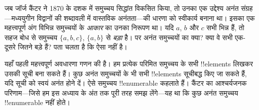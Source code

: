 \documentclass[../../../include/open-logic-section]{subfiles}
\begin{document}


जब जॉर्ज कैंटर ने 1870 के दशक में समुच्चय सिद्धांत विकसित किया, तो उनका एक
उद्देश्य अनंत संग्रह---मध्ययुगीन विद्वानों की शब्दावली में वास्तविक
अनंतता---की धारणा को स्वीकार्य बनाना था। इसका एक महत्त्वपूर्ण अंग विभिन्न
समुच्चयों के \emph{आकार} का उनका निरूपण था। यदि $a$, $b$ और $c$ सभी भिन्न
हैं, तो सहज बोध से समुच्चय $\{a, b, c\}$, $\{a, b\}$ से \emph{बड़ा} है।
पर अनंत समुच्चयों का क्या? क्या वे सभी एक-दूसरे जितने बड़े हैं? पता चलता है
कि ऐसा नहीं है।

यहाँ पहली महत्त्वपूर्ण अवधारणा गणन की है। हम प्रत्येक परिमित समुच्चय के सभी
!!{element}s लिखकर उसकी सूची बना सकते हैं। कुछ अनंत समुच्चयों के भी सभी
!!{element}s सूचीबद्ध किए जा सकते हैं, यदि सूची को स्वयं अनंत होने दें।
ऐसे समुच्चय !!{enumerable} कहलाते हैं। कैंटर का आश्चर्यजनक परिणाम---जिसे हम
इस अध्याय के अंत तक पूरी तरह समझ लेंगे---यह था कि कुछ अनंत समुच्चय
!!{enumerable} नहीं होते।
\end{document}
